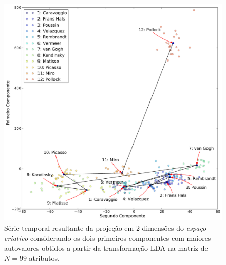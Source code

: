 \begin{figure}[h!]
\begin{center}
        \caption{Série temporal resultante da projeção em 2 dimensões do
        \textit{espaço criativo} considerando os dois primeiros componentes com
        maiores autovalores obtidos a partir da transformação LDA na matriz de
        $N = 99$ atributos.}
        \label{fig:caso3_g1}
        \includegraphics[width=\columnwidth]{figs/caso3_g1}
        \fonteminha
\end{center}
\end{figure}

